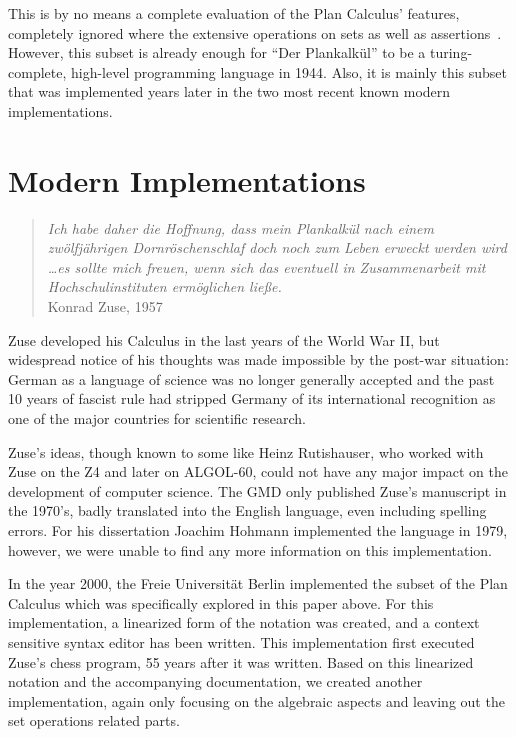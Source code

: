 \documentclass{llncs}
\begin{document}
 This is by no means a complete evaluation of the Plan Calculus' features, completely ignored where 
 the extensive operations on sets as well as assertions~\cite{zuse1948allgemeinen,epegmagHorstzuse}. 
 However, this subset is already enough for ``Der Plankalkül'' to be a turing-complete, high-level 
 programming language in 1944. Also, it is mainly this subset that was implemented years later in 
 the two most recent known modern implementations.
 \section{Modern Implementations}
 \begin{quote}
   \raggedright
   {\it Ich habe daher die Hoffnung, dass mein Plankalkül nach einem zwölfjährigen Dornröschenschlaf 
     doch noch zum Leben erweckt werden wird \dots es sollte mich freuen, wenn sich das eventuell in 
     Zusammenarbeit mit Hochschulinstituten ermöglichen ließe.}\\
   \raggedleft Konrad Zuse, 1957
 \end{quote}
 Zuse developed his Calculus in the last years of the World War II, but widespread notice of his
 thoughts was made impossible by the post-war situation: German as a language of science was no 
 longer generally accepted and the past 10 years of fascist rule had stripped Germany of its international 
 recognition as one of the major countries for scientific research.

 Zuse's ideas, though known to some like Heinz Rutishauser, who worked with Zuse on the Z4\cite{epegmagHorstzuse} and 
 later on ALGOL-60,
 could not have any major impact on the development of computer science. The GMD only published Zuse's
 manuscript in the 1970's, badly translated into the English language, even including spelling errors\cite{giloi2002konrad}.
 For his dissertation Joachim Hohmann implemented the language in 1979\cite{rojas2002konrad}, however, we were 
 unable to find any more information on this implementation.

 In the year 2000, the Freie Universität Berlin implemented the subset of the Plan Calculus which was specifically 
 explored in this paper above\cite{rojas2002plankalkuel}. For this implementation, a linearized form of the notation was created, and 
 a context sensitive syntax editor has been written. This implementation first executed Zuse's chess program, 
 55 years after it was written. Based on this linearized notation and the accompanying documentation, 
 we created another implementation, again only focusing on the algebraic aspects and leaving out the 
 set operations related parts. 
 
\end{document}
